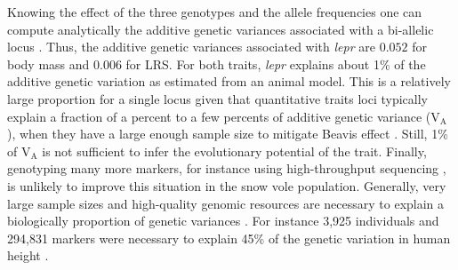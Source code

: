 Knowing the effect of the three genotypes and the allele frequencies one can compute analytically the additive genetic variances associated with a bi-allelic locus \parencite[][p77]{Fisher1941average,Lynch1998}. Thus, the additive genetic variances associated with \emph{lepr} are $0.052$  for body mass and $0.006$ for LRS. For both traits, \emph{lepr} explains about 1\% of the additive genetic variation as estimated from an animal model. This is a relatively large proportion for a single locus given that quantitative traits loci typically explain a fraction of a percent to a few percents of additive genetic variance (V$_\text{A}$), when they have a large enough sample size to mitigate Beavis effect \parencite{Flint2009,Jensen2014}.  Still, 1\% of V$_\text{A}$ is not sufficient to infer the evolutionary potential of the trait. Finally, genotyping many more markers, for instance using high-throughput sequencing \parencite{Goodwin2016}, is unlikely to improve this situation in the snow vole population. Generally, very large sample sizes and high-quality genomic resources are necessary to explain a biologically proportion of genetic variances \parencite{Bloom2013, Jensen2014}. For instance 3,925 individuals and 294,831 markers were necessary to explain 45\% of the genetic variation in human height \parencite{Yang2010}. 



